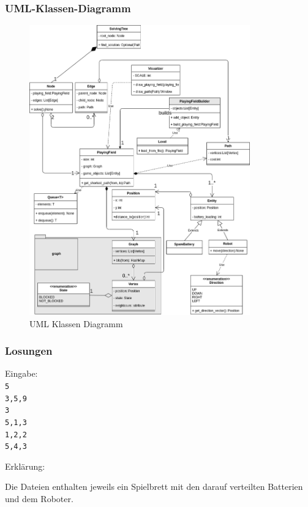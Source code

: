 \documentclass[a4paper,12pt,arial]{scrartcl}
\begin{document}
\newpage
\subsubsection{UML-Klassen-Diagramm}
\begin{figure}[h]
    \centering
    \includegraphics[width=0.85\textwidth]{uml_diagramm_v5.png}
    \caption{UML Klassen Diagramm}
    \label{fig:uml}
\end{figure}
\newpage

\newpage
\subsubsection{Losungen}


Eingabe:
\texttt{ \\
5 \\
3,5,9 \\
3 \\
5,1,3 \\
1,2,2 \\
5,4,3 \\
}
\par
Erklärung:

Die Dateien enthalten jeweils ein Spielbrett mit den darauf verteilten Batterien und dem Roboter.
\end{document}
